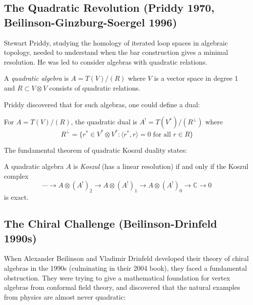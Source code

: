 \subsection{The Quadratic Revolution (Priddy 1970, Beilinson-Ginzburg-Soergel 1996)}

Stewart Priddy, studying the homology of iterated loop spaces in algebraic topology, needed to understand when the bar construction gives a minimal resolution. He was led to consider algebras with quadratic relations.

\begin{definition}
A \emph{quadratic algebra} is $A = T(V)/(R)$ where $V$ is a vector space in degree 1 and $R \subset V \otimes V$ consists of quadratic relations.
\end{definition}

Priddy discovered that for such algebras, one could define a dual:

\begin{definition}
For $A = T(V)/(R)$, the quadratic dual is $A^! = T(V^*)/(R^{\perp})$ where
\[
R^{\perp} = \{r^* \in V^* \otimes V^* : \langle r^*, r \rangle = 0 \text{ for all } r \in R\}
\]
\end{definition}

The fundamental theorem of quadratic Koszul duality states:

\begin{theorem}
A quadratic algebra $A$ is \emph{Koszul} (has a linear resolution) if and only if the Koszul complex
\[
\cdots \to A \otimes (A^!)_2 \to A \otimes (A^!)_1 \to A \otimes (A^!)_0 \to \mathbb{C} \to 0
\]
is exact.
\end{theorem}

\subsection{The Chiral Challenge (Beilinson-Drinfeld 1990s)}

When Alexander Beilinson and Vladimir Drinfeld developed their theory of chiral algebras in the 1990s (culminating in their 2004 book), they faced a fundamental obstruction. They were trying to give a mathematical foundation for vertex algebras from conformal field theory, and discovered that the natural examples from physics are almost never quadratic:

